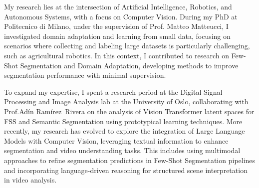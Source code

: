 

\begin{cvparagraph}
    My research lies at the intersection of Artificial Intelligence, Robotics, and Autonomous Systems, with a focus on Computer Vision. During my PhD at Politecnico di Milano, under the supervision of Prof. Matteo Matteucci, I investigated domain adaptation and learning from small data, focusing on scenarios where collecting and labeling large datasets is particularly challenging, such as agricultural robotics. In this context, I contributed to research on Few-Shot Segmentation  and Domain Adaptation, developing methods to improve segmentation performance with minimal supervision.

    To expand my expertise, I spent a research period at the Digital Signal Processing and Image Analysis lab at the University of Oslo, collaborating with Prof.Ad\'in Ram\'irez~Rivera on the analysis of Vision Transformer latent spaces for FSS and Semantic Segmentation using prototypical learning techniques. More recently, my research has evolved to explore the integration of Large Language Models with Computer Vision, leveraging textual information to enhance segmentation and video understanding tasks. This includes using multimodal approaches to refine segmentation predictions in Few-Shot Segmentation pipelines and incorporating language-driven reasoning for structured scene interpretation in video analysis. 
\end{cvparagraph}